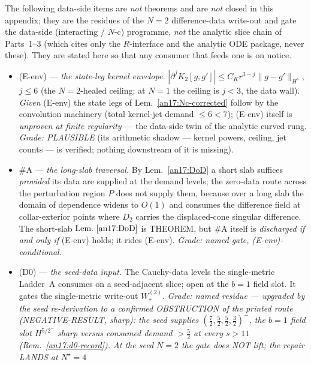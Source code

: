 \begin{remark}\label{an17:named-residues}
The following data-side items are \emph{not} theorems and are \emph{not} closed
in this appendix; they are the residues of the $N{=}2$ difference-data write-out
and gate the data-side (interacting / $N$-c) programme, \emph{not} the analytic
slice chain of Parts~1--3 (which cites only the $R$-interface and the analytic
ODE package, never these). They are stated here so that any consumer that feeds
one is on notice.
\begin{itemize}[leftmargin=*,nosep]
\item \textup{(E-env)} --- \emph{the state-leg kernel envelope.}
  $|\partial^jK_2[g,g']|\le C_K r^{3-j}\|g-g'\|_{H^s}$, $j\le6$ (the
  $N{=}2$-healed ceiling; at $N{=}1$ the ceiling is $j<3$, the data wall).
  \emph{Given} (E-env) the state legs of Lem.~\ref{an17:Nc-corrected} follow by
  the convolution machinery (total kernel-jet demand $\le6<7$); (E-env) itself
  is \emph{unproven at finite regularity} --- the data-side twin of the analytic
  curved rung. \emph{Grade: PLAUSIBLE} (its arithmetic shadow --- kernel powers,
  ceiling, jet counts --- is verified; nothing downstream of it is missing).
\item \#A --- \emph{the long-slab traversal.} By Lem.~\ref{an17:DoD} a short slab
  suffices \emph{provided} its data are supplied at the demand levels; the
  zero-data route across the perturbation region $P$ does not supply them, because
  over a long slab the domain of dependence widens to $O(1)$ and consumes the
  difference field at collar-exterior points where $D_2$ carries the
  displaced-cone singular difference. The short-slab $\textup{Lem.~\ref{an17:DoD}}$
  is THEOREM, but \#A itself is \emph{discharged if and only if} (E-env) holds;
  it rides (E-env). \emph{Grade: named gate, (E-env)-conditional.}
\item \textup{(D0)} --- \emph{the seed-data input.} The Cauchy-data levels the
  single-metric Ladder~A consumes on a seed-adjacent slice; open at the $b=1$
  field slot. It gates the single-metric write-out $W^{(2)}_*$. \emph{Grade:
  named residue --- upgraded by the seed re-derivation to a confirmed OBSTRUCTION of the
  printed route (NEGATIVE-RESULT, sharp): the seed supplies
  $(\tfrac72,\tfrac52,\tfrac52,\tfrac32)^-$, the $b{=}1$ field slot
  $H^{5/2^-}$ sharp versus consumed demand $>\tfrac52$ at every $s>11$
  (Rem.~\ref{an17:d0-record}). At the seed $N{=}2$ the gate does NOT lift; the repair LANDS at $N^\star{=}4$
}
\end{itemize}
\end{remark}
